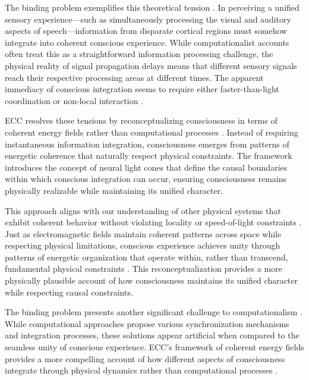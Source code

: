 The binding problem exemplifies this theoretical tension \cite{maturana1980autopoiesis}. In perceiving a unified sensory experience—such as simultaneously processing the visual and auditory aspects of speech—information from disparate cortical regions must somehow integrate into coherent conscious experience. While computationalist accounts often treat this as a straightforward information processing challenge, the physical reality of signal propagation delays means that different sensory signals reach their respective processing areas at different times. The apparent immediacy of conscious integration seems to require either faster-than-light coordination or non-local interaction \cite{harnad1990symbol}.

ECC resolves these tensions by reconceptualizing consciousness in terms of coherent energy fields rather than computational processes \cite{bickhard1995foundational}. Instead of requiring instantaneous information integration, consciousness emerges from patterns of energetic coherence that naturally respect physical constraints. The framework introduces the concept of neural light cones that define the causal boundaries within which conscious integration can occur, ensuring consciousness remains physically realizable while maintaining its unified character.

This approach aligns with our understanding of other physical systems that exhibit coherent behavior without violating locality or speed-of-light constraints \cite{dreyfus1972what}. Just as electromagnetic fields maintain coherent patterns across space while respecting physical limitations, conscious experience achieves unity through patterns of energetic organization that operate within, rather than transcend, fundamental physical constraints \cite{fodor2000mind}. This reconceptualization provides a more physically plausible account of how consciousness maintains its unified character while respecting causal constraints.

The binding problem presents another significant challenge to computationalism \cite{maturana1980autopoiesis}. While computational approaches propose various synchronization mechanisms and integration processes, these solutions appear artificial when compared to the seamless unity of conscious experience. ECC's framework of coherent energy fields provides a more compelling account of how different aspects of consciousness integrate through physical dynamics rather than computational processes \cite{bickhard1995foundational}.

